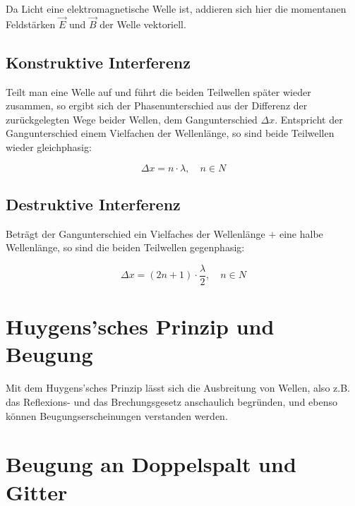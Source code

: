     Da Licht eine elektromagnetische Welle ist, addieren sich hier die momentanen Feldstärken $\vec{E}$ und $\vec{B}$ der Welle vektoriell.

    \subsection{Konstruktive Interferenz}
        
        Teilt man eine Welle auf und führt die beiden Teilwellen später wieder zusammen, so ergibt sich der Phasenunterschied aus der Differenz der zurückgelegten Wege beider Wellen, dem Gangunterschied $\Delta x$. Entspricht der Gangunterschied einem Vielfachen der Wellenlänge, so sind beide Teilwellen wieder gleichphasig:

        $$\Delta x = n \cdot \lambda, \quad n \in N$$

    \subsection{Destruktive Interferenz}
        
        Beträgt der Gangunterschied ein Vielfaches der Wellenlänge $+$ eine halbe Wellenlänge, so sind die beiden Teilwellen gegenphasig:

        $$\Delta x = (2n + 1) \cdot \frac{\lambda}{2}, \quad n \in N$$

\section{Huygens'sches Prinzip und Beugung}
    
    Mit dem Huygens'sches Prinzip lässt sich die Ausbreitung von Wellen, also z.B. das Reflexions- und das Brechungsgesetz anschaulich begründen, und ebenso können Beugungserscheinungen verstanden werden.
    

\section{Beugung an Doppelspalt und Gitter}
    
